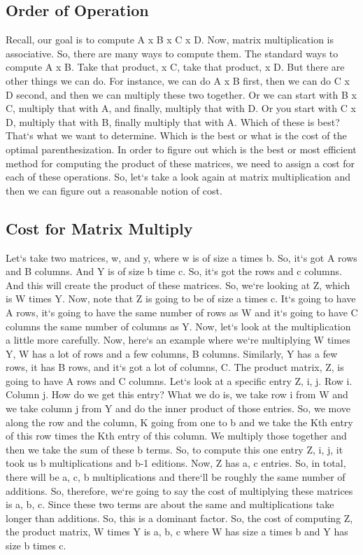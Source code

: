 \subsection{Order of Operation}
Recall, our goal is to compute A x B x C x D\@.
Now, matrix multiplication is associative.
So, there are many ways to compute them.
The standard ways to compute A x B\@.
Take that product, x C, take that product, x D\@.
But there are other things we can do.
For instance, we can do A x B first, then we can do C x D second, and then we can multiply these two together.
Or we can start with B x C, multiply that with A, and finally, multiply that with D\@.
Or you start with C x D, multiply that with B, finally multiply that with A\@.
Which of these is best? That`s what we want to determine.
Which is the best or what is the cost of the optimal parenthesization.
In order to figure out which is the best or most efficient method for computing the product of these matrices, we need to assign a cost for each of these operations.
So, let`s take a look again at matrix multiplication and then we can figure out a reasonable notion of cost.

\subsection{Cost for Matrix Multiply}
Let`s take two matrices, w, and y, where w is of size a times b.
So, it`s got A rows and B columns.
And Y is of size b time c.
So, it`s got the rows and c columns.
And this will create the product of these matrices.
So, we`re looking at Z, which is W times Y\@.
Now, note that Z is going to be of size a times c.
It`s going to have A rows, it`s going to have the same number of rows as W and it`s going to have C columns the same number of columns as Y\@.
Now, let`s look at the multiplication a little more carefully.
Now, here`s an example where we`re multiplying W times Y, W has a lot of rows and a few columns, B columns.
Similarly, Y has a few rows, it has B rows, and it`s got a lot of columns, C\@.
The product matrix, Z, is going to have A rows and C columns.
Let`s look at a specific entry Z, i, j.
Row i.
Column j.
How do we get this entry? What we do is, we take row i from W and we take column j from Y and do the inner product of those entries.
So, we move along the row and the column, K going from one to b and we take the Kth entry of this row times the Kth entry of this column.
We multiply those together and then we take the sum of these b terms.
So, to compute this one entry Z, i, j, it took us b multiplications and b-1 editions.
Now, Z has a, c entries.
So, in total, there will be a, c, b multiplications and there`ll be roughly the same number of additions.
So, therefore, we`re going to say the cost of multiplying these matrices is a, b, c.
Since these two terms are about the same and multiplications take longer than additions.
So, this is a dominant factor.
So, the cost of computing Z, the product matrix, W times Y is a, b, c where W has size a times b and Y has size b times c.


